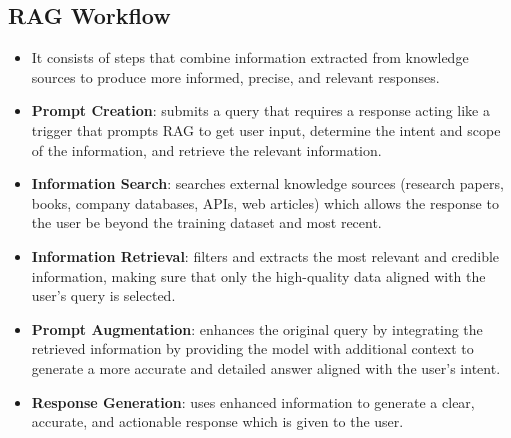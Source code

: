 \documentclass[12pt, letterpaper]{article}
\begin{document}
\subsection{RAG Workflow}
\begin{itemize}
    \item It consists of steps that combine information extracted from knowledge sources to produce more informed, precise, and relevant responses.
    \item \textbf{Prompt Creation}: submits a query that requires a response acting like a trigger that prompts RAG to get user input, determine the intent and scope of the information, and retrieve the relevant information.
    \item \textbf{Information Search}: searches external knowledge sources (research papers, books, company databases, APIs, web articles) which allows the response to the user be beyond the training dataset and most recent.
    \item \textbf{Information Retrieval}: filters and extracts the most relevant and credible information, making sure that only the high-quality data aligned with the user's query is selected.
    \item \textbf{Prompt Augmentation}: enhances the original query by integrating the retrieved information by providing the model with additional context to generate a more accurate and detailed answer aligned with the user's intent.
    \item \textbf{Response Generation}: uses enhanced information to generate a clear, accurate, and actionable response which is given to the user.
\end{itemize}
\end{document}
